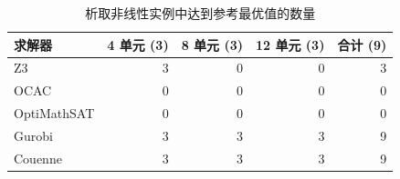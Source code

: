 \begin{table}[H]
\centering
\caption{析取非线性实例中达到参考最优值的数量}
\label{tab:exp-nra-disjunctive}
\small
\setlength{\tabcolsep}{6pt}
\begin{tabular}{@{}lrrrr@{}}
\toprule
求解器 & 4 单元 (3) & 8 单元 (3) & 12 单元 (3) & 合计 (9) \\
\midrule
Z3 & 3 & 0 & 0 & 3 \\
OCAC & 0 & 0 & 0 & 0 \\
OptiMathSAT & 0 & 0 & 0 & 0 \\
\midrule
Gurobi & 3 & 3 & 3 & 9 \\
Couenne & 3 & 3 & 3 & 9 \\
\bottomrule
\end{tabular}
\end{table}
